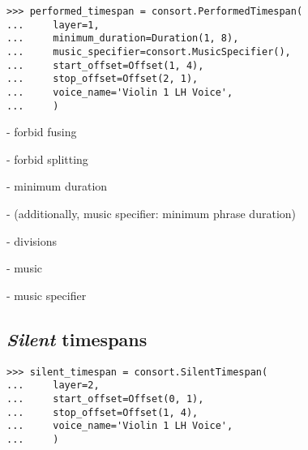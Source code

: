 \begin{comment}
<abjad>
performed_timespan = consort.PerformedTimespan(
    layer=1,
    minimum_duration=Duration(1, 8),
    music_specifier=consort.MusicSpecifier(),
    start_offset=Offset(1, 4),
    stop_offset=Offset(2, 1),
    voice_name='Violin 1 LH Voice',
    )
</abjad>
\end{comment}

\begin{singlespacing}
\vspace{-0.5\baselineskip}
\begin{lstlisting}
>>> performed_timespan = consort.PerformedTimespan(
...     layer=1,
...     minimum_duration=Duration(1, 8),
...     music_specifier=consort.MusicSpecifier(),
...     start_offset=Offset(1, 4),
...     stop_offset=Offset(2, 1),
...     voice_name='Violin 1 LH Voice',
...     )
\end{lstlisting}
\end{singlespacing}

- forbid fusing

- forbid splitting

- minimum duration

- (additionally, music specifier: minimum phrase duration)

- divisions

- music

- music specifier

\subsection{\emph{Silent} timespans} %

\begin{comment}
<abjad>
silent_timespan = consort.SilentTimespan(
    layer=2,
    start_offset=Offset(0, 1),
    stop_offset=Offset(1, 4),
    voice_name='Violin 1 LH Voice',
    )
</abjad>
\end{comment}

\begin{singlespacing}
\vspace{-0.5\baselineskip}
\begin{lstlisting}
>>> silent_timespan = consort.SilentTimespan(
...     layer=2,
...     start_offset=Offset(0, 1),
...     stop_offset=Offset(1, 4),
...     voice_name='Violin 1 LH Voice',
...     )
\end{lstlisting}
\end{singlespacing}


